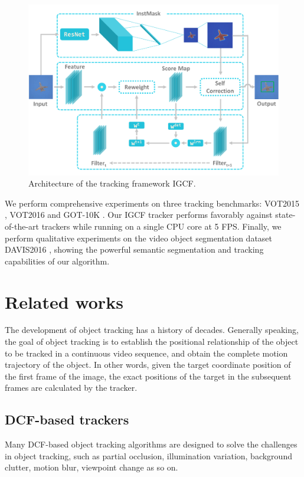 \documentclass[review]{elsarticle}
\begin{document}
\begin{CJK*}{UTF8}{gbsn}
\begin{figure}
    \centering
    \includegraphics[width=12cm]{images/instmask1.pdf}
    \caption{Architecture of the tracking framework IGCF.}
    \label{fig:IGCF}
\end{figure}

We perform comprehensive experiments on three tracking benchmarks: VOT2015 \cite{Kristan2015TheVO}, VOT2016 \cite{Kristan2016TheVO} and GOT-10K \cite{Huang2018GOT10kAL}. Our IGCF tracker performs favorably against state-of-the-art trackers while running on a single CPU core at 5 FPS. Finally, we perform qualitative experiments on the video object segmentation dataset DAVIS2016 \cite{Perazzi2016}, showing the powerful semantic segmentation and tracking capabilities of our algorithm.

\section{Related works}
The development of object tracking has a history of decades. Generally speaking, the goal of object tracking is to establish the positional relationship of the object to be tracked in a continuous video sequence, and obtain the complete motion trajectory of the object. In other words, given the target coordinate position of the first frame of the image, the exact positions of the target in the subsequent frames are calculated by the tracker. 

\subsection{DCF-based trackers}
Many DCF-based object tracking algorithms are designed to solve the challenges in object tracking, such as partial occlusion, illumination variation, background clutter, motion blur, viewpoint change as so on.


\end{CJK*}
\end{document}
